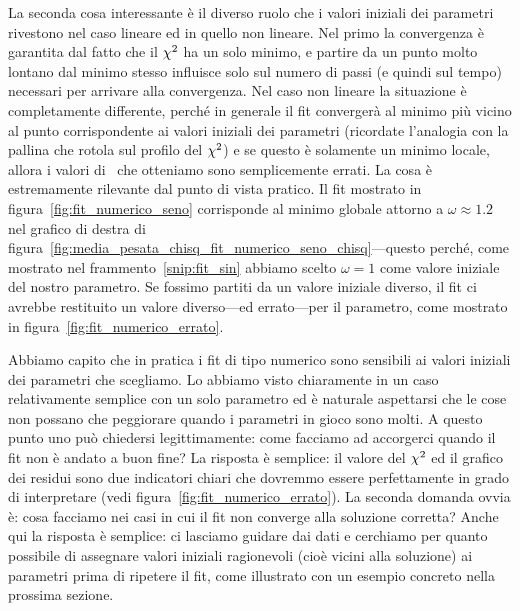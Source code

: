 La seconda cosa interessante è il diverso ruolo che i valori iniziali dei
parametri rivestono nel caso lineare ed in quello non lineare. Nel primo
la convergenza è garantita dal fatto che il $\chi^2$ ha un solo minimo, e
partire da un punto molto lontano dal minimo stesso influisce solo sul numero di
passi (e quindi sul tempo) necessari per arrivare alla convergenza. Nel caso non
lineare la situazione è completamente differente, perché in generale
il fit convergerà al minimo più vicino al punto corrispondente ai
valori iniziali dei parametri (ricordate l'analogia con la pallina che rotola
sul profilo del $\chi^2$) e se questo è solamente un minimo locale,
allora i valori di \bestfit\ che otteniamo sono semplicemente errati.
La cosa è estremamente rilevante dal punto di vista pratico. Il fit
mostrato in figura~\ref{fig:fit_numerico_seno} corrisponde al minimo globale
attorno a $\omega \approx 1.2$ nel grafico di destra di
figura~\ref{fig:media_pesata_chisq_fit_numerico_seno_chisq}---questo perché,
come mostrato nel frammento~\ref{snip:fit_sin} abbiamo scelto $\omega = 1$
come valore iniziale del nostro parametro. Se fossimo partiti da un valore
iniziale diverso, il fit ci avrebbe restituito un valore diverso---ed
errato---per il parametro, come mostrato in
figura~\ref{fig:fit_numerico_errato}.


Abbiamo capito che in pratica i fit di tipo numerico sono sensibili ai
valori iniziali dei parametri che scegliamo. Lo abbiamo visto chiaramente in
un caso relativamente semplice con un solo parametro ed è naturale aspettarsi
che le cose non possano che peggiorare quando i parametri in gioco sono molti.
A questo punto uno può chiedersi legittimamente: come facciamo ad accorgerci
quando il fit non è andato a buon fine? La risposta è semplice: il
valore del $\chi^2$ ed il grafico dei residui sono due indicatori chiari che
dovremmo essere perfettamente in grado di interpretare (vedi
figura~\ref{fig:fit_numerico_errato}). La seconda domanda ovvia è: cosa
facciamo nei casi in cui il fit non converge alla soluzione corretta?
Anche qui la risposta è semplice: ci lasciamo guidare dai dati e cerchiamo
per quanto possibile di assegnare valori iniziali ragionevoli (cioè vicini
alla soluzione) ai parametri prima di ripetere il fit, come illustrato
con un esempio concreto nella prossima sezione.



